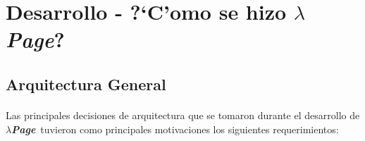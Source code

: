 \documentclass[a4paper]{article}
\newcommand{\hpage}{\textbf{\textsl{$\lambda$Page}}}
\begin{document}
\newpage
\section{Desarrollo - ?`C'omo se hizo \hpage?}
\subsection{Arquitectura General}
\begin{epigraphs}
\end{epigraphs}
\paragraph{}Las principales decisiones de arquitectura que se tomaron durante el desarrollo de \hpage\ tuvieron como principales motivaciones los siguientes requerimientos:
\end{document}
